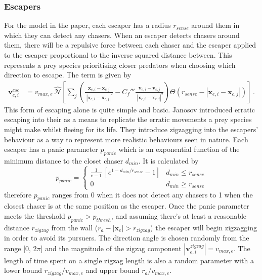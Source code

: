 \documentclass[%
11pt,
amsmath, amssymb,
aps,
pra
]{revtex4-2}
\begin{document}
\subsubsection{Escapers}
For the model in the paper, each escaper has a radius \(r_{sense}\) around them in which they can detect any chasers.
When an escaper detects chasers around them, there will be a repulsive force between each chaser and the escaper applied to the
escaper proportional to the inverse squared distance between. This represents a prey species prioritising closer predators
when choosing which direction to escape. The term is given by 
\begin{align}
    \mathbf{v}_{e, i}^{esc} &= v_{max, e}\, \hat{\mathcal{N}}\left[ 
        \sum_{j}\left(  \frac{\mathbf{x}_{e, i} - \mathbf{x}_{c, j}}{\;|\mathbf{x}_{e, i} - \mathbf{x}_{c, j}|^2} 
        - C_f''' \frac{\mathbf{v}_{e, i} - \mathbf{v}_{c, j}}{\;|\mathbf{x}_{e, i} - \mathbf{x}_{c, j}|^2}         \right)
        \Theta(r_{sense} - |\mathbf{x}_{e, i} - \mathbf{x}_{c, j}|)
        \right]\,.
\end{align}
This form of escaping alone is quite simple and basic. Janosov introduced erratic escaping into their as a means to replicate
the erratic movements a prey species might make whilst fleeing for its life. They introduce zigzagging into the escapers'
behaviour as a way to represent more realistic behaviours seen in nature.
Each escaper has a panic parameter \(p_{panic}\) which is an exponential function of the minimum distance to the closet chaser
\(d_{min}\). It is calculated by 
\begin{equation}
    p_{panic} = \begin{cases}
        \frac{1}{e-1}\,\left[e^{1 - d_{min}/r_{sense}} - 1\right] & d_{min} \le r_{sense}\\
        0 & d_{min} \ge r_{sense}
    \end{cases}
\end{equation}
therefore \(p_{panic}\) ranges from 0 when it does not detect any chasers to 1 when the closest chaser is at the same position as the escaper.
Once the panic parameter meets the threshold \(p_{panic} > p_{thresh}\), and assuming there's at least a reasonable distance \(r_{zigzag}\) from the
wall (\(r_a - |\mathbf{x}_e| > r_{zigzag}\)) the escaper will begin zigzagging in order to avoid its pursuers.
The direction angle is chosen randomly from the range [0, \(2\pi\)] and the magnitude of the zigzag component 
\(|\mathbf{v}_{e, i}^{zigzag}| = v_{max, e}\). The length of time spent on  a single zigzag length
is also a random parameter with a lower bound \(r_{zigzag}/v_{max, e}\) and upper bound \(r_{a}/v_{max, e}\).
\end{document}
